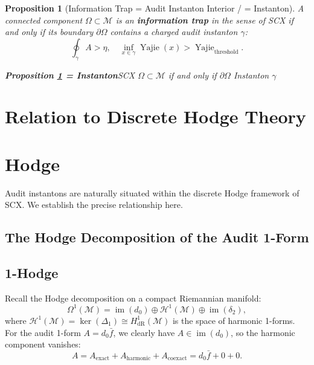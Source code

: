 \documentclass[11pt,a4paper]{article}
\theoremstyle{plain}
\newtheorem{proposition}[theorem]{Proposition}
\theoremstyle{definition}
\DeclareMathOperator{\im}{im}
\DeclareMathOperator{\Yajie}{Yajie}
\newcommand{\cM}{\mathcal{M}}
\begin{document}
\begin{proposition}[Information Trap = Audit Instanton Interior /  = Instanton]
\label{prop:info_trap}
A connected component $\Omega \subset \cM$ is an \textbf{information trap} 
in the sense of SCX if and only if its boundary $\partial \Omega$ contains 
a charged audit instanton $\gamma$:
\begin{equation}
  \oint_{\gamma} A > \eta, \quad \inf_{x \in \gamma} \Yajie(x) > \Yajie_{\text{threshold}}.
  \label{eq:info_trap_cond}
\end{equation}
\end{proposition}

\bigskip
\noindent
\textit{\textbf{Proposition \ref{prop:info_trap} = Instanton}SCX $\Omega \subset \cM$ \textbf{}if and only if $\partial \Omega$ Instanton $\gamma$}

\section{Relation to Discrete Hodge Theory}
\section*{Hodge}

Audit instantons are naturally situated within the discrete Hodge 
framework of SCX. We establish the precise relationship here.

\subsection{The Hodge Decomposition of the Audit 1-Form}
\subsection*{1-Hodge}

Recall the Hodge decomposition on a compact Riemannian manifold:
\begin{equation}
  \Omega^1(\cM) = \im(d_0) \oplus \mathcal{H}^1(\cM) \oplus \im(\delta_2),
  \label{eq:hodge_decomp}
\end{equation}
where $\mathcal{H}^1(\cM) = \ker(\Delta_1) \cong H^1_{\text{dR}}(\cM)$ is the 
space of harmonic 1-forms. For the audit 1-form $A = d_0 \bar{f}$, we 
clearly have $A \in \im(d_0)$, so the harmonic component vanishes:
\begin{equation}
  A = A_{\text{exact}} + A_{\text{harmonic}} + A_{\text{coexact}} = d_0 \bar{f} + 0 + 0.
  \label{eq:A_decomp}
\end{equation}
\end{document}
